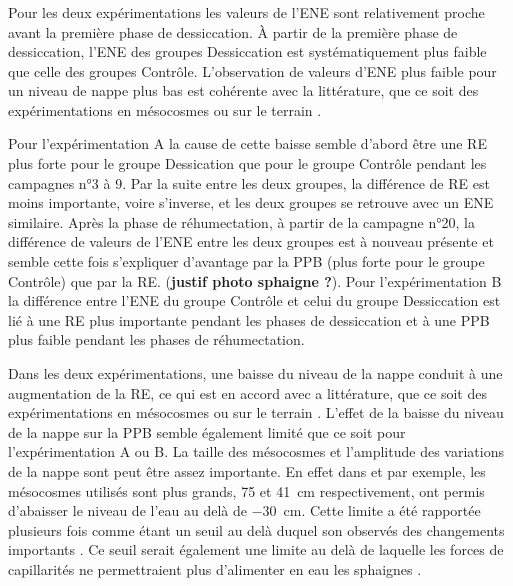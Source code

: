 \subsubsection{\coo}

Pour les deux expérimentations les valeurs de l'ENE sont relativement proche avant la première phase de dessiccation.
À partir de la première phase de dessiccation, l'ENE des groupes Dessiccation est systématiquement plus faible que celle des groupes Contrôle.
L'observation de valeurs d'ENE plus faible pour un niveau de nappe plus bas est cohérente avec la littérature, que ce soit des expérimentations en mésocosmes \citet{aerts1997,blodau2004} ou sur le terrain \citet{bubier2003,sonnentag2010}.

Pour l'expérimentation A la cause de cette baisse semble d'abord être une RE plus forte pour le groupe Dessication que pour le groupe Contrôle pendant les campagnes n°3 à 9.
Par la suite entre les deux groupes, la différence de RE est moins importante, voire s'inverse, et les deux groupes se retrouve avec un ENE similaire.
Après la phase de réhumectation, à partir de la campagne n°20, la différence de valeurs de l'ENE entre les deux groupes est à nouveau présente et semble cette fois s'expliquer d'avantage par la PPB (plus forte pour le groupe Contrôle) que par la RE. (\textbf{justif photo sphaigne ?}).
Pour l'expérimentation B la différence entre l'ENE du groupe Contrôle et celui du groupe Dessiccation est lié à une RE plus importante pendant les phases de dessiccation et à une PPB plus faible pendant les phases de réhumectation.

Dans les deux expérimentations, une baisse du niveau de la nappe conduit à une augmentation de la RE, ce qui est en accord avec a littérature, que ce soit des expérimentations en mésocosmes \citet{blodau2004,dinsmore2009} ou sur le terrain \citet{ballantyne2014}. 
L'effet de la baisse du niveau de la nappe sur la PPB semble également limité que ce soit pour l'expérimentation A ou B.
La taille des mésocosmes et l'amplitude des variations de la nappe sont peut être assez importante.
En effet dans \citet{blodau2004} et \citet{dinsmore2009} par exemple, les mésocosmes utilisés sont plus grands, 75 et \SI{41}{\centi\metre} respectivement, ont permis d'abaisser le niveau de l'eau au delà de \SI{-30}{\centi\metre}.
Cette limite a été rapportée plusieurs fois comme étant un seuil au delà duquel son observés des changements importants \citep{blodau2004,peichl2014}.
Ce seuil serait également une limite au delà de laquelle les forces de capillarités ne permettraient plus d'alimenter en eau les sphaignes \citep{rydin2013a,ketcheson2014}.

